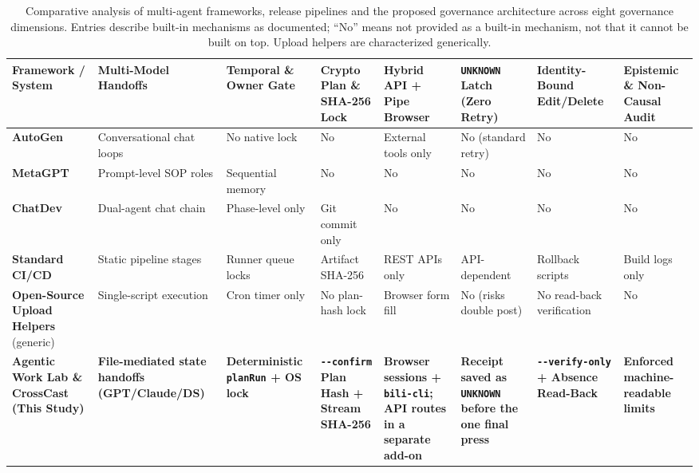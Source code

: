 \documentclass[11pt,a4paper]{article}
\theoremstyle{definition}
\begin{document}
\begin{table}[htbp]
\centering
\caption{Comparative analysis of multi-agent frameworks, release pipelines and the proposed governance architecture across eight governance dimensions. Entries describe built-in mechanisms as documented; ``No'' means not provided as a built-in mechanism, not that it cannot be built on top. Upload helpers are characterized generically.}
\label{tab:1}
\scriptsize
\setlength{\tabcolsep}{2.2pt}
\begin{tabular}{>{\raggedright\hspace{0pt}\arraybackslash}p{}>{\raggedright\hspace{0pt}\arraybackslash}p{}>{\raggedright\hspace{0pt}\arraybackslash}p{}>{\raggedright\hspace{0pt}\arraybackslash}p{}>{\raggedright\hspace{0pt}\arraybackslash}p{}>{\raggedright\hspace{0pt}\arraybackslash}p{}>{\raggedright\hspace{0pt}\arraybackslash}p{}>{\raggedright\hspace{0pt}\arraybackslash}p{}}
\toprule
\textbf{Framework / System} & \textbf{Multi-Model Handoffs} & \textbf{Temporal \& Owner Gate} & \textbf{Crypto Plan \& SHA-256 Lock} & \textbf{Hybrid API + Pipe Browser} & \textbf{\texttt{UNKNOWN} Latch (Zero Retry)} & \textbf{Identity-Bound Edit/Delete} & \textbf{Epistemic \& Non-Causal Audit} \\
\midrule
\textbf{AutoGen} \citep{Wu2023AutoGen} & Conversational chat loops & No native lock & No & External tools only & No (standard retry) & No & No \\
\textbf{MetaGPT} \citep{Hong2023MetaGPT} & Prompt-level SOP roles & Sequential memory & No & No & No & No & No \\
\textbf{ChatDev} \citep{Qian2024ChatDev} & Dual-agent chat chain & Phase-level only & Git commit only & No & No & No & No \\
\textbf{Standard CI/CD} \citep{Humble2010} & Static pipeline stages & Runner queue locks & Artifact SHA-256 & REST APIs only & API-dependent & Rollback scripts & Build logs only \\
\textbf{Open-Source Upload Helpers} (generic) & Single-script execution & Cron timer only & No plan-hash lock & Browser form fill & No (risks double post) & No read-back verification & No \\
\midrule
\textbf{\textbf{Agentic Work Lab \& CrossCast (This Study)}} & \textbf{File-mediated state handoffs (GPT/Claude/DS)} & \textbf{Deterministic \texttt{planRun} + OS lock} & \textbf{\texttt{-{}-confirm} Plan Hash + Stream SHA-256} & \textbf{Browser sessions + \texttt{bili-cli}; API routes in a separate add-on} & \textbf{Receipt saved as \texttt{UNKNOWN} before the one final press} & \textbf{\texttt{-{}-verify-only} + Absence Read-Back} & \textbf{Enforced machine-readable limits} \\
\bottomrule
\end{tabular}
\end{table}
\end{document}
